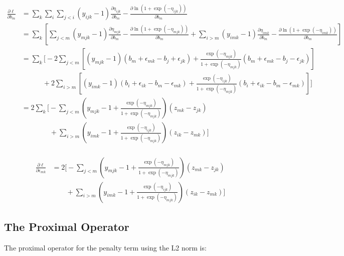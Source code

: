 \documentclass{article}
\begin{document}
\begin{align*}
\frac{\partial \ell}{\partial b_{m}} & =  \sum_k \sum_{i}  \sum_{j<i} (y_{ijk} -1)\frac{\partial \eta_{ijk}}{\partial b_{m}} - \frac{\partial \ln (1+\exp(-\eta_{ijk}))}{\partial b_{m}} \\
& =  \sum_k\left[ \sum_{j<m} (y_{mjk} -1)\frac{\partial \eta_{mjk}}{\partial b_{m}} - \frac{\partial \ln (1+\exp(-\eta_{mjk}))}{\partial b_{m}} +  \sum_{i > m} (y_{imk} -1)\frac{\partial \eta_{imk}}{\partial b_{m}} - \frac{\partial \ln (1+\exp(-\eta_{imk}))}{\partial b_{m}} \right] \\
%
& =  \sum_k\bigg[ -2 \sum_{j<m} \left[(y_{mjk} -1)(b_m + \epsilon_{mk} - b_j + \epsilon_{jk}) + \frac{\exp(-\eta_{mjk})}{1+\exp(-\eta_{mjk})}(b_m + \epsilon_{mk} - b_j - \epsilon_{jk}) \right] \\
& \quad\quad\quad +  2 \sum_{i > m} \left[(y_{imk} -1)(b_i + \epsilon_{ik} - b_m - \epsilon_{mk}) +\frac{\exp(-\eta_{ijk})}{1+\exp(-\eta_{mjk})}(b_i + \epsilon_{ik} - b_m - \epsilon_{mk}) \right] \bigg] \\
& =  2 \sum_k\bigg[ - \sum_{j<m} \left(y_{mjk} -1 + \frac{\exp(-\eta_{mjk})}{1+\exp(-\eta_{mjk})}\right)(z_{mk} - z_{jk})\\
& \quad\quad\quad\quad +  \sum_{i > m} \left(y_{imk} -1 + \frac{\exp(-\eta_{ijk})}{1+\exp(-\eta_{mjk})}\right)(z_{ik} - z_{mk}) \bigg] \\
%
\end{align*}

\begin{align*}
\frac{\partial \ell}{\partial \epsilon_{mk}} & = 2 \bigg[ - \sum_{j<m} \left(y_{mjk} -1 + \frac{\exp(-\eta_{mjk})}{1+\exp(-\eta_{mjk})}\right)(z_{mk} - z_{jk})\\
& \quad\quad +  \sum_{i > m} \left(y_{imk} -1 + \frac{\exp(-\eta_{ijk})}{1+\exp(-\eta_{mjk})}\right)(z_{ik} - z_{mk}) \bigg]
\end{align*}

\subsection{The Proximal Operator}


The proximal operator for the penalty term using the L2 norm is: %
\end{document}
